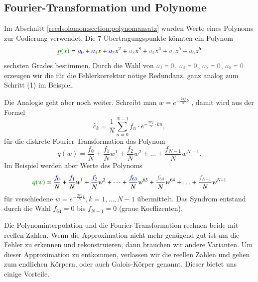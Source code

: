 \subsection{Fourier-Transformation und Polynome\label{reedsolomon:subsection:ftandpolynom}}
Im Abschnitt \ref{reedsolomon:section:polynomansatz}
wurden Werte eines Polynoms zur Codierung verwendet.
Die 7 Übertragungspunkte könnten ein Polynom
\begin{equation}
	\textcolor{darkgreen}{p(x)}
	=
	\textcolor{blue}{a_0} + \textcolor{blue}{a_1}x + \textcolor{blue}{a_2}x^2 +
	\textcolor{gray}{a_3}x^3 + \textcolor{gray}{a_4}x^4 + \textcolor{gray}{a_5}x^5 +
	\textcolor{gray}{a_6}x^6
\label{reedsolomon:equationpoly}
\end{equation}
sechsten Grades bestimmen.
Durch die Wahl von $\textcolor{gray}{a_3=0}$, $\textcolor{gray}{a_4=0}$, $\textcolor{gray}{a_5=0}$, $\textcolor{gray}{a_6=0}$ 
erzeugen wir die für die Fehlerkorrektur nötige Redundanz, ganz analog zum Schritt (1) im Beispiel.
\par 
Die Analogie geht aber noch weiter.
 Schreibt man 
 \( w =
 e^{-\frac{2\pi j}{N} k}\)
 \label{reedsolomon:DFT_summand}, damit wird aus der Formel
 \begin{equation}
	\hat{c}_{k} 
	= \frac{1}{N} \sum_{n=0}^{N-1}
	{f}_n \cdot e^{-\frac{2\pi j}{N} \cdot kn}
	,\label{reedsolomon:DFT}
 \end{equation}
 für die diskrete-Fourier-Transformation das Polynom
 \begin{equation}
	q(w)=
	\frac{{f}_0}{N} + \frac{{f}_1}{N} w^1 + \frac{{f}_2}{N} w^2 + \dots + \frac{{f}_{N-1}}{N} w^{N-1}.
	\label{reedsolomon:DFT_polynom}
 \end{equation}
 Im Beispiel werden aber Werte des Polynoms
 \begin{equation}
	\textcolor{darkgreen}{q(w)}=
	\frac{\textcolor{blue}{{f}_0}}{N} + \frac{\textcolor{blue}{{f}_1}}{N} w^1 + \frac{\textcolor{blue}{{f}_2}}{N} w^2 + \dots + 
	\frac{\textcolor{blue}{{f}_{63}}}{N} w^{63} + \frac{\textcolor{gray}{{f}_{64}}}{N} w^{64} + \textcolor{gray}{\dots} + \frac{\textcolor{gray}{{f}_{N-1}}}{N} w^{N-1}
	\label{reedsolomon:DFT_polynom2}
 \end{equation}
	für verschiedene \( w = e^{-\frac{2\pi j}{N} k}, k=1, \dots ,N-1\) übermittelt.
Das Syndrom entstand durch die Wahl ${f_{64}}=0$ bis ${f}_{N-1}=0$ (graue Koeffizenten).
\par
Die Polynominterpolation und die Fourier-Transformation rechnen beide mit reellen Zahlen.
Wenn die Approximation nicht mehr genügend gut ist um die Fehler zu erkennen und rekonstruieren,
dann brauchen wir andere Varianten.
Um dieser Approximation zu entkommen, verlassen wir die reellen Zahlen und gehen zum endlichen Körpern, oder auch Galois-Körper genannt.
Dieser bietet uns einige Vorteile.
